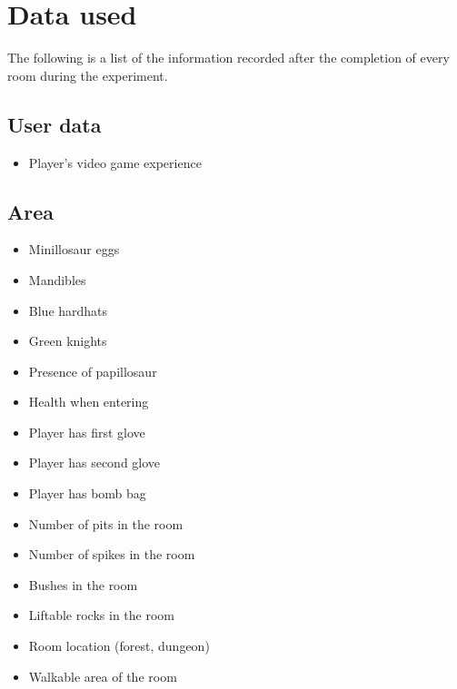 \documentclass[a4paper]{article}
\begin{document}
\clearpage
\appendix
\section{Data used}
The following is a list of the information recorded after the completion of every room during the experiment.

\begin{multicols}{2}
\subsection{User data}
\begin{itemize}
\item Player's video game experience
\end{itemize}
\subsection{Area}
\begin{itemize}
\item Minillosaur eggs
\item Mandibles
\item Blue hardhats
\item Green knights
\item Presence of papillosaur
\item Health when entering
\item Player has first glove
\item Player has second glove
\item Player has bomb bag
\item Number of pits in the room
\item Number of spikes in the room
\item Bushes in the room
\item Liftable rocks in the room
\item Room location (forest, dungeon)
\item Walkable area of the room
\end{itemize}

\end{multicols}
\end{document}
